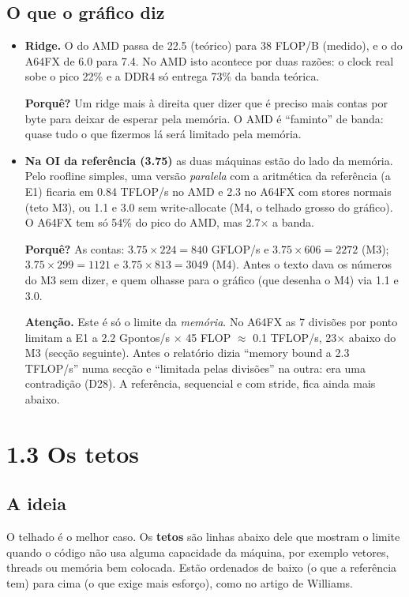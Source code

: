 \documentclass[11pt,a4paper]{article}
\newcommand{\porque}[1]{\par\noindent\colorbox{blue!6}{\parbox{\dimexpr\linewidth-2\fboxsep}{\small\textbf{Porquê?} #1}}\par}
\newcommand{\cuidado}[1]{\par\noindent\colorbox{orange!10}{\parbox{\dimexpr\linewidth-2\fboxsep}{\small\textbf{Atenção.} #1}}\par}
\begin{document}
\subsection{O que o gráfico diz}
\begin{itemize}
\item \textbf{Ridge.} O do AMD passa de 22.5 (teórico) para 38 FLOP/B (medido), e o do A64FX de 6.0
para 7.4. No AMD isto acontece por duas razões: o clock real sobe o pico 22\% e a DDR4 só entrega 73\%
da banda teórica.
\porque{Um ridge mais à direita quer dizer que é preciso mais contas por byte para deixar de esperar pela
memória. O AMD é ``faminto'' de banda: quase tudo o que fizermos lá será limitado pela memória.}
\item \textbf{Na OI da referência (3.75)} as duas máquinas estão do lado da memória. Pelo roofline
simples, uma versão \emph{paralela} com a aritmética da referência (a E1) ficaria em 0.84 TFLOP/s no AMD
e 2.3 no A64FX com stores normais (teto M3), ou 1.1 e 3.0 sem write-allocate (M4, o telhado grosso do
gráfico). O A64FX tem só 54\% do pico do AMD, mas 2.7$\times$ a banda.
\porque{As contas: $3.75\times224=840$ GFLOP/s e $3.75\times606=2272$ (M3); $3.75\times299=1121$ e
$3.75\times813=3049$ (M4). Antes o texto dava os números do M3 sem dizer, e quem olhasse para o
gráfico (que desenha o M4) via 1.1 e 3.0.}
\cuidado{Este é só o limite da \emph{memória}. No A64FX as 7 divisões por ponto limitam a E1 a
2.2 Gpontos/s $\times$ 45 FLOP $\approx$ 0.1 TFLOP/s, 23$\times$ abaixo do M3 (secção seguinte). Antes o
relatório dizia ``memory bound a 2.3 TFLOP/s'' numa secção e ``limitada pelas divisões'' na outra: era
uma contradição (D28). A referência, sequencial e com stride, fica ainda mais abaixo.}
\end{itemize}

\section{1.3 Os tetos}\label{sec:tetos}
\subsection{A ideia}
O telhado é o melhor caso. Os \textbf{tetos} são linhas abaixo dele que mostram o limite quando o código
não usa alguma capacidade da máquina, por exemplo vetores, threads ou memória bem colocada. Estão
ordenados de baixo (o que a referência tem) para cima (o que exige mais esforço), como no artigo de
Williams.
\end{document}
